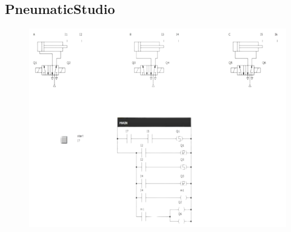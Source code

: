 \documentclass[12pt]{article}
\begin{document}
\subsection{PneumaticStudio}
\begin{figure}[h]
	\centering
	\includegraphics[scale=0.9]{ps.png}
	\label{fig:pneumatic studio}
\end{figure}
\newpage
\end{document}
